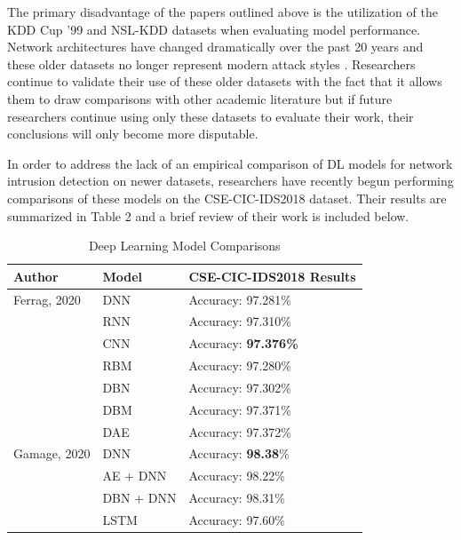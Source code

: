 \documentclass[conference]{IEEEtran}
\begin{document}

The primary disadvantage of the papers outlined above is the utilization of the KDD Cup '99 and NSL-KDD datasets when evaluating model performance. Network architectures have changed dramatically over the past 20 years and these older datasets no longer represent modern attack styles \cite{b4}. Researchers continue to validate their use of these older datasets with the fact that it allows them to draw comparisons with other academic literature \cite{b10} but if future researchers continue using only these datasets to evaluate their work, their conclusions will only become more disputable. 


In order to address the lack of an empirical comparison of DL models for network intrusion detection on newer datasets, researchers have recently begun performing comparisons of these models on the CSE-CIC-IDS2018 dataset. Their results are summarized in Table 2 and a brief review of their work is included below.

\begin{table}[htbp]
\caption{Deep Learning Model Comparisons}
\begin{center}
\begin{tabular}{|p{1.7cm}|p{2cm}|p{3.5cm}|}
\hline
\textbf{Author} & \textbf{Model} & \textbf{CSE-CIC-IDS2018 Results}\\[2pt]
\hline
Ferrag, 2020 & DNN & Accuracy: 97.281\%\\[2pt]
 & RNN & Accuracy: 97.310\%\\[2pt]
 & CNN & Accuracy: \textbf{97.376\%}\\[2pt]
 & RBM & Accuracy: 97.280\%\\[2pt]
 & DBN & Accuracy: 97.302\%\\[2pt]
 & DBM & Accuracy: 97.371\%\\[2pt]
 & DAE & Accuracy: 97.372\%\\[2pt]
\hline 
Gamage, 2020 & DNN & Accuracy: \textbf{98.38}\%\\[2pt]
 & AE + DNN & Accuracy: 98.22\%\\[2pt]
 & DBN + DNN & Accuracy: 98.31\%\\[2pt]
 & LSTM & Accuracy: 97.60\%\\[2pt]
\hline
\end{tabular}
\label{tab1}
\end{center}
\end{table}
\end{document}
